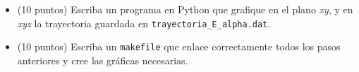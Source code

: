 \documentclass{article}
\begin{document}
\begin{enumerate}
\begin{itemize}
\item (10 puntos) Escriba un programa en Python que grafique en el
  plano {\it xy}, y en {\it xyz} la trayectoria guardada en
  \verb"trayectoria_E_alpha.dat".

\item (10 puntos) Escriba un \verb"makefile" que enlace correctamente
  todos los pasos anteriores y cree las gr\'aficas necesarias.
\end{itemize}


\end{enumerate}
\end{document}
